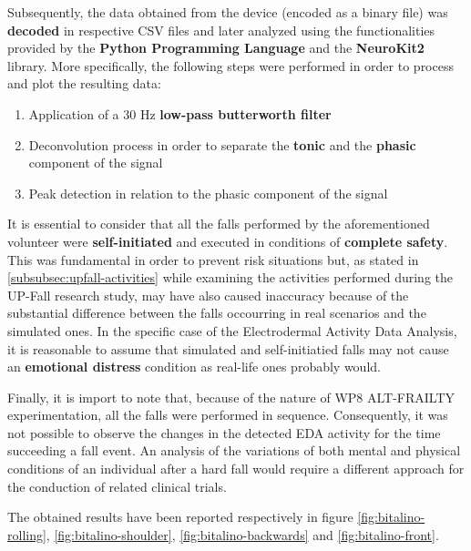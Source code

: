 Subsequently, the data obtained from the device (encoded as a binary file) was \textbf{decoded} in respective CSV files and later analyzed using the functionalities provided by the \textbf{Python Programming Language} and the \textbf{NeuroKit2} \cite{neurokit} library. More specifically, the following steps were performed in order to process and plot the resulting data:

\begin{enumerate}
    \item Application of a 30 Hz \textbf{low-pass butterworth filter} 
    \item Deconvolution process in order to separate the \textbf{tonic} and the \textbf{phasic} component of the signal
    \item Peak detection in relation to the phasic component of the signal
\end{enumerate}

It is essential to consider that all the falls performed by the aforementioned volunteer were \textbf{self-initiated} and executed in conditions of \textbf{complete safety}. This was fundamental in order to prevent risk situations but, as stated in \ref{subsubsec:upfall-activities} while examining the activities performed during the UP-Fall research study, may have also caused inaccuracy because of the substantial difference between the falls occourring in real scenarios and the simulated ones. In the specific case of the Electrodermal Activity Data Analysis, it is reasonable to assume that simulated and self-initiatied falls may not cause an \textbf{emotional distress} condition as real-life ones probably would.

Finally, it is import to note that, because of the nature of WP8 ALT-FRAILTY experimentation, all the falls were performed in sequence. Consequently, it was not possible to observe the changes in the detected EDA activity for the time succeeding a fall event. An analysis of the variations of both mental and physical conditions of an individual after a hard fall would require a different approach for the conduction of related clinical trials. 

The obtained results have been reported respectively in figure \ref{fig:bitalino-rolling}, \ref{fig:bitalino-shoulder}, \ref{fig:bitalino-backwards} and \ref{fig:bitalino-front}.

